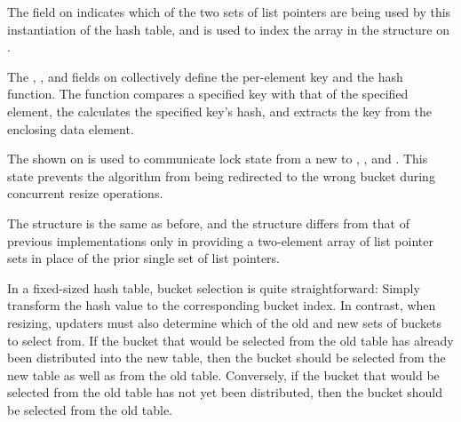 \begin{fcvref}
The  field on
 indicates which of the two sets of
list pointers are being used by this instantiation of the hash table,
and is used to index the  array in the 
structure on .

The , , and  fields on
collectively define the per-element key and the hash function.
The  function compares a specified key with that of
the specified element,
the  calculates the specified key's hash,
and  extracts the key from the enclosing data
element.

The  shown on 
is used to communicate lock state from a new 
to , , and .
This state prevents the algorithm from being redirected to the wrong
bucket during concurrent resize operations.

The  structure is the same as before, and the
 structure differs from that of previous implementations
only in providing a two-element array of list pointer sets in place of
the prior single set of list pointers.

In a fixed-sized hash table, bucket selection is quite straightforward:
Simply transform the hash value to the corresponding bucket index.
In contrast, when resizing, updaters must also determine which of the
old and new sets of buckets to select from.
If the bucket that would be selected from the old table has already
been distributed into the new table, then the bucket should be selected
from the new table as well as from the old table.
Conversely, if the bucket that would be selected from the old table
has not yet been distributed, then the bucket should be selected from
the old table.
\end{fcvref}

\begin{listing}

\caption{Resizable Hash-Table Bucket Selection}
\label{lst:datastruct:Resizable Hash-Table Bucket Selection}
\end{listing}

